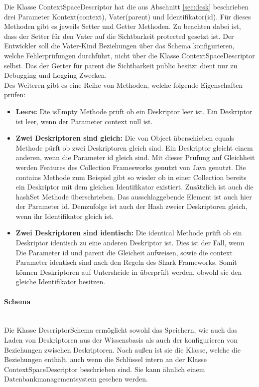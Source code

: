 \documentclass[a4paper]{article}
\begin{document}
	Die Klasse ContextSpaceDescriptor hat die aus Abschnitt \ref{sec:desk} 
	beschrieben drei Parameter Kontext(context), Vater(parent) und
	Identifikator(id). Für dieses Methoden gibt es jeweils Setter und Getter
	Methoden. Zu beachten dabei ist, dass der Setter für den Vater auf die
	Sichtbarkeit protected gesetzt ist. Der Entwickler soll die	Vater-Kind
	Beziehungen über das Schema konfigurieren, welche Fehlerprüfungen durchführt,
	nicht über die Klasse ContextSpaceDescriptor selbst. Das der Getter für
	parent die Sichtbarkeit public besitzt dient nur zu Debugging und Logging
	Zwecken.\\
	
	Des Weiteren gibt es eine Reihe von Methoden, welche folgende Eigenschaften
	prüfen:
	
	\begin{itemize}
		\item \textbf{Leere:} Die isEmpty Methode prüft ob ein Deskriptor
		leer ist. Ein Deskriptor ist leer, wenn der Parameter context null ist.
		\item \textbf{Zwei Deskriptoren sind gleich:} Die von Object überschieben
		equals Methode pürft ob zwei Deskriptoren gleich sind. Ein Deskriptor
		gleicht einem anderen, wenn die Parameter id gleich sind. Mit dieser
		Prüfung	auf Gleichheit werden Features des Collection Framesworks genutzt
		von Java genutzt. Die contains Methode zum Beispiel gibt so wieder ob
		in einer Collection bereits ein Deskriptor mit dem gleichen Identifikator
		existiert. Zusätzlich ist auch die hashSet Methode überschrieben. Das
		ausschlaggebende Element ist auch hier der Parameter id. Demzufolge
		ist auch der Hash zweier Deskriptoren gleich, wenn ihr Identifikator 
		gleich ist.
		\item \textbf{Zwei Deskriptoren sind identisch:} Die identical Methode
		prüft ob ein Deskriptor identisch zu eine anderen Deskriptor ist. Dies
		ist der Fall, wenn Die Parameter id und parent die Gleicheit aufweisen,
		sowie die context Parameter identisch sind nach den Regeln des Shark
		Frameworks. Somit können Deskriptoren auf Untershcide in überprüft werden,
		obwohl sie den gleiche Identifikator besitzen.
	\end{itemize}
	
	\paragraph{Schema}\mbox{} \\
	
	Die Klasse DescriptorSchema ermöglicht sowohl das Speichern, wie auch das
	Laden von Deskriptoren aus der Wissensbasis als auch der konfigurieren von
	Beziehungen	zwischen Deskriptoren. Nach außen ist sie die Klasse, welche
	die Beziehungen enthält, auch wenn die Schlüssel intern an der Klasse
	ContextSpaceDescriptor beschrieben sind. Sie kann ähnlich einem 
	Datenbankmanagementsystem gesehen werden. \\
	
\end{document}

